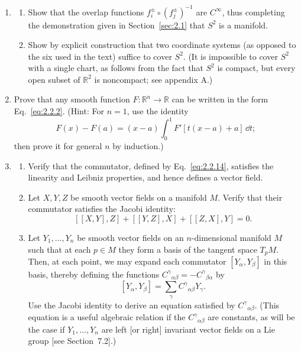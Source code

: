 
\chapterproblems

\begin{enumerate}[label=\arabic*., leftmargin=*]
  \item
  \begin{enumerate}[label=\alph*)]
    \item Show that the overlap functions
      \(f_i^\pm\circ(f_j^\pm)^{-1}\) are \(C^\infty\), thus completing the
      demonstration given in Section~\ref{sec:2.1} that \(S^2\) is a manifold.

    \item Show by explicit construction that two coordinate systems (as opposed to
      the six used in the text) suffice to cover \(S^2\).  (It is impossible to
      cover \(S^2\) with a single chart, as follows from the fact that \(S^2\) is
      compact, but every open subset of \(\mathbb{R}^2\) is noncompact; see
      appendix A.)
  \end{enumerate}

  \item Prove that any smooth function \(F:\mathbb{R}^n\to\mathbb{R}\) can be
  written in the form Eq.~\eqref{eq:2.2.2}.  (Hint: For \(n=1\), use the identity
  \[
    F(x)-F(a)=(x-a)\int_0^1 F'[t(x-a)+a]\,\dd t ;
  \]
  then prove it for general \(n\) by induction.)

  \item
  \begin{enumerate}[label=\alph*)]
    \item Verify that the commutator, defined by Eq.~\eqref{eq:2.2.14}, satisfies
      the linearity and Leibniz properties, and hence defines a vector field.

    \item Let \(X,Y,Z\) be smooth vector fields on a manifold \(M\).  Verify
      that their commutator satisfies the Jacobi identity:
      \[
        [[X,Y],Z]+[[Y,Z],X]+[[Z,X],Y]=0 .
      \]

    \item Let \(Y_1,\ldots,Y_n\) be smooth vector fields on an \(n\)-dimensional
      manifold \(M\) such that at each \(p\in M\) they form a basis of the tangent
      space \(T_pM\).  Then, at each point, we may expand each commutator
      \([Y_\alpha,Y_\beta]\) in this basis, thereby defining the functions
      \(C^\gamma{}_{\alpha\beta}=-C^\gamma{}_{\beta\alpha}\) by
      \[
        [Y_\alpha,Y_\beta]=\sum_\gamma C^\gamma{}_{\alpha\beta}Y_\gamma .
      \]
      Use the Jacobi identity to derive an equation satisfied by
      \(C^\gamma{}_{\alpha\beta}\).  (This equation is a useful algebraic relation
      if the \(C^\gamma{}_{\alpha\beta}\) are constants, as will be the case if
      \(Y_1,\ldots,Y_n\) are left [or right] invariant vector fields on a Lie group
      [see Section~7.2].)
  \end{enumerate}


\end{enumerate}
